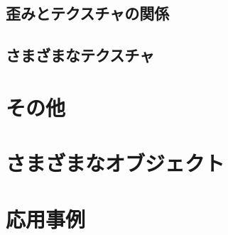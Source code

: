 \subsection{歪みとテクスチャの関係}
\label{SS}

\subsection{さまざまなテクスチャ}
\label{SS}

\section{その他}
\label{S}

\section{さまざまなオブジェクト}
\label{S}

\section{応用事例}
\label{S}









